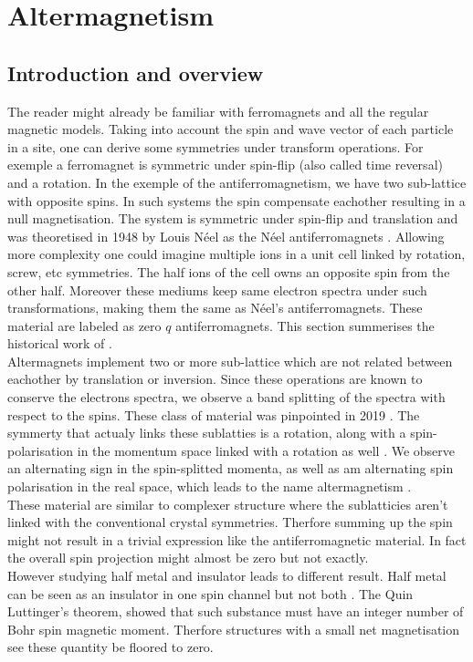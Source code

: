 \documentclass[../main.tex]{main.tex}
\begin{document}
\section{Altermagnetism}
\subsection{Introduction and overview}
The reader might already be familiar with ferromagnets and all the regular magnetic models. Taking into account the spin and
wave vector of each particle in a site, one can derive some symmetries under transform operations. For exemple a
ferromagnet is symmetric under spin-flip (also called time reversal) and a rotation. In the exemple of the antiferromagnetism,
we have two sub-lattice with opposite spins. In such systems the spin compensate eachother resulting in a null magnetisation.
The system is symmetric under spin-flip and translation and was theoretised in 1948 by Louis Néel as the Néel antiferromagnets \cite{Neel1936}.
Allowing more complexity one could imagine multiple ions in a unit cell linked by rotation, screw, etc symmetries. The half ions 
of the cell owns an opposite spin from the other half.
Moreover these mediums keep same electron spectra under such transformations, making them the same as Néel's antiferromagnets.
These material are labeled as zero $q$ antiferromagnets.
This section summerises the historical work of \cite{Mazin2024}.\\

Altermagnets implement two or more sub-lattice which are not related between eachother by translation or inversion.
Since these operations are known to conserve the electrons spectra, we observe a band splitting of the spectra with respect to the spins.
These class of material was pinpointed in 2019 \cite{Hayami2019}. The symmerty that actualy links these sublatties is a rotation,
along with a spin-polarisation in the momentum space linked with a rotation as well \cite{Smejkal2022}.
We observe an alternating sign in the spin-splitted momenta, as well as am alternating spin polarisation in the real space,
which leads to the name altermagnetism \cite{Smejkal2022_2}.\\
These material are similar to complexer structure where the sublatticies aren't linked with the conventional crystal symmetries.
Therfore summing up the spin might not result in a trivial expression like the antiferromagnetic material. In fact the overall
spin projection might almost be zero but not exactly.\\
However studying half metal and insulator leads to different result. Half metal can be seen as an insulator in one spin channel 
but not both \cite{Mazin2024}. The Quin Luttinger's theorem, showed that such substance must have an integer number of Bohr spin
magnetic moment. Therfore structures with a small net magnetisation see these quantity be floored to zero. \\
\end{document}
